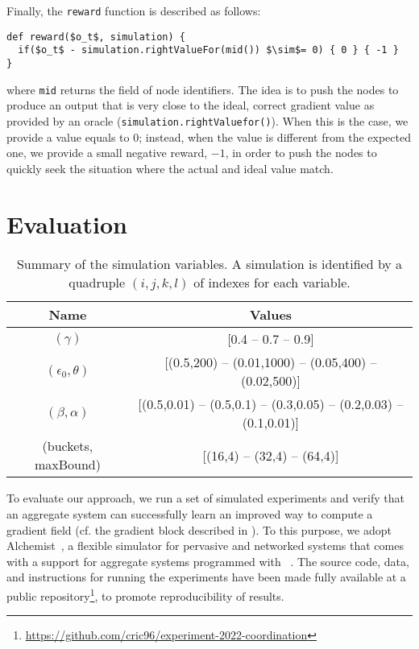 %
Finally, the \texttt{reward} function is described as follows: 
\begin{lstlisting}[mathescape]
def reward($o_t$, simulation) {
  if($o_t$ - simulation.rightValueFor(mid()) $\sim$= 0) { 0 } { -1 }
}
\end{lstlisting}
where \lstinline|mid| returns the field of node identifiers. 
The idea is to push the nodes to produce an output that is very close to the ideal, correct gradient value as provided by an oracle (\lstinline|simulation.rightValuefor()|).
When this is the case, we provide a value equals to $0$;
instead, when the value is different from the expected one, 
 we provide a small negative reward, $-1$, in order to push the nodes to quickly seek the situation where the actual and ideal value match.

\section{Evaluation}\label{s:eval}

\begin{table}[t]
  \centering
  \begin{tabular}{|c|c|}
    \hline
    Name &  Values \\ \hline
    $(\gamma)$ & [0.4 -- 0.7 -- 0.9] \\  \hline
    $(\epsilon_0, \theta)$ & [(0.5,200) -- (0.01,1000) -- (0.05,400) -- (0.02,500)] \\ \hline
    $(\beta, \alpha)$ & [(0.5,0.01) -- (0.5,0.1) -- (0.3,0.05) -- (0.2,0.03) -- (0.1,0.01)]
    \\  \hline
    (buckets, maxBound) & [(16,4) -- (32,4) -- (64,4)]\\ \hline
  \end{tabular}
  \caption{Summary of the simulation variables. 
  A simulation is identified by a quadruple $(i, j, k, l)$ of indexes for each variable. 
  }
  \label{table:parameters}
\end{table}

To evaluate our approach, we run a set of simulated experiments and verify that an aggregate system
 can successfully learn an improved way to compute a gradient field (cf. the gradient block described in ).
%
To this purpose, we adopt Alchemist~\cite{DBLP:journals/jos/PianiniMV13},
 a flexible simulator 
 for pervasive and networked systems
 that comes with a support for aggregate systems 
 programmed with \scafi{}~\cite{DBLP:conf/isola/CasadeiVAD20}. 
%
The source code, data, and instructions for running the experiments have been made fully available at a public repository\footnote{\url{https://github.com/cric96/experiment-2022-coordination}}, to promote reproducibility of results.

